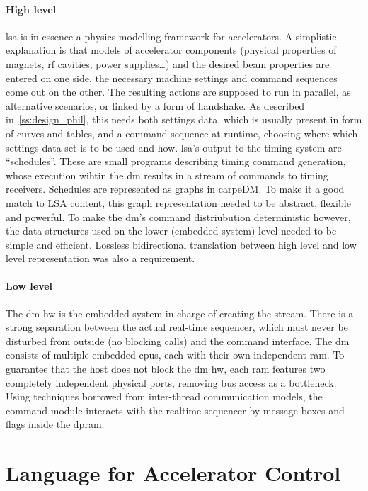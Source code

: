 \paragraph{High level}
\gls{lsa} is in essence a physics modelling framework for accelerators. A simplistic explanation is that models of accelerator components (physical properties of magnets, \gls{rf} cavities, power supplies\dots) and the desired beam properties are entered on one side, the necessary machine settings and command sequences come out on the other. The resulting actions are supposed to run in parallel, as alternative scenarios, or linked by a form of handshake.
As described in~\ref{ss:design_phil}, this needs both settings data, which is usually present in form of curves and tables, and a command sequence at runtime, choosing where which settings data set is to be used and how.
\gls{lsa}'s output to the timing system are \enquote{schedules}. These are small programs describing timing command generation, whose execution wihtin the \gls{dm} results in a stream of commands to timing receivers. Schedules are represented as graphs in carpeDM. To make it a good match to LSA content, this graph representation needed to be abstract, flexible and powerful. To make the \gls{dm}'s command distriubution deterministic however, the data structures used on the lower (embedded system) level needed to be simple and efficient. Lossless bidirectional translation between high level and low level representation was also a requirement.
\paragraph{Low level}
The \gls{dm} \gls{hw} is the embedded system in charge of creating the stream. There is a strong separation between the actual real-time sequencer,
which must never be disturbed from outside (no blocking calls) and the command interface. The \gls{dm} consists of multiple embedded \gls{cpu}s, each with their own independent \gls{ram}. To guarantee that the host does not block the \gls{dm} \gls{hw}, each \gls{ram} features two completely independent physical ports, removing bus access as a bottleneck. Using techniques borrowed from inter-thread communication models, the command module interacts with the realtime sequencer by message boxes and flags inside the \gls{dpram}.
\newpage
\section{Language for Accelerator Control}

